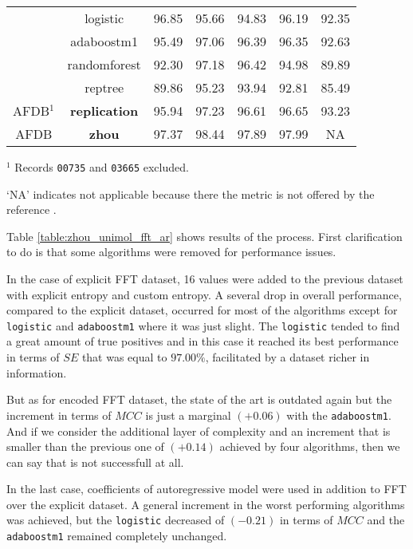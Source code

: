 \begin{table}[h]
\begin{center}
\begin{threeparttable}
\begin{tabular}{c c c c c c c}
  & logistic & 96.85 & 95.66 & 94.83 & 96.19 & 92.35 \\
  & adaboostm1 & 95.49 & 97.06 & 96.39 & 96.35 & 92.63 \\
  & randomforest & 92.30 & 97.18 & 96.42 & 94.98 & 89.89 \\
  & reptree & 89.86 & 95.23 & 93.94 & 92.81 & 85.49 \\
  \hline
  AFDB$^1$ & \textbf{replication} & 95.94 & 97.23 & 96.61 & 96.65 & 93.23 \\
  \hline
  AFDB & \textbf{zhou} & 97.37 & 98.44 & 97.89 & 97.99 & NA \\
  \bottomrule
\end{tabular}
\begin{tablenotes}
	\item $^1$ Records \verb|00735| and \verb|03665| excluded.
 	\item ‘NA’ indicates not applicable because there the metric is not offered by the reference \cite{zhou2015}.
    \end{tablenotes}
\end{threeparttable}
\end{center}
\end{table}
Table \ref{table:zhou_unimol_fft_ar} shows results of the process. First clarification to do is that some algorithms were removed for performance issues.

In the case of explicit FFT dataset, 16 values were added to the previous dataset with explicit entropy and custom entropy. A several drop in overall performance, compared to the explicit dataset, occurred for most of the algorithms except for \verb|logistic| and \verb|adaboostm1| where it was just slight. The \verb|logistic| tended to find a great amount of true positives and in this case it reached its best performance in terms of $SE$ that was equal to $97.00\%$, facilitated by a dataset richer in information.

But as for encoded FFT dataset, the state of the art is outdated again but the increment in terms of $MCC$ is just a marginal $(+0.06)$ with the \verb|adaboostm1|. And if we consider the additional layer of complexity and an increment that is smaller than the previous one of $(+0.14)$ achieved by four algorithms, then we can say that is not successfull at all.

In the last case, coefficients of autoregressive model were used in addition to FFT over the explicit dataset. A general increment in the worst performing algorithms was achieved, but the \verb|logistic| decreased of $(-0.21)$ in terms of $MCC$ and the \verb|adaboostm1| remained completely unchanged. 

